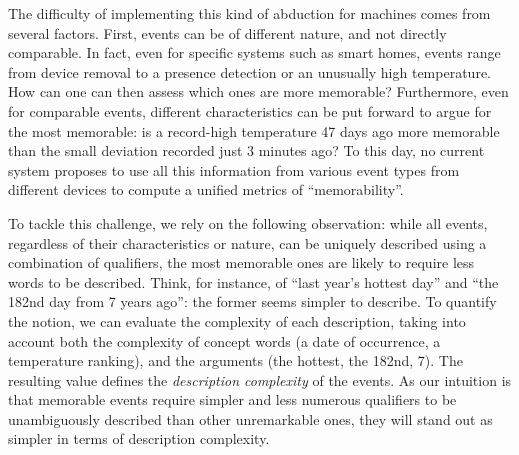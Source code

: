 \documentclass[conference]{IEEEtran}
\begin{document}
The difficulty of implementing this kind of abduction for machines comes from
several factors. First, events can be of different nature, and not directly
comparable. In fact, even for specific systems such as smart homes, events
range from device removal to a presence detection or an unusually high
temperature. How can one can then assess which ones are more memorable?
Furthermore, even for comparable events, different characteristics can be put
forward to argue for the most memorable: is a record-high temperature 47 days
ago more memorable than the small deviation recorded just 3 minutes ago? To
this day, no current system proposes to use all this information from various
event types from different devices to compute a unified metrics of
``memorability''.



To tackle this challenge, we rely on the following observation: while all
events, regardless of their characteristics or nature, can be uniquely
described using a combination of qualifiers, the most memorable ones are
likely to require less words to be described. Think, for instance, of
``last year's hottest day'' and ``the 182nd day from 7 years ago'': the
former seems simpler to describe. To quantify the notion, we can evaluate the complexity of each
description, taking into account both the complexity of concept words (a date
of occurrence, a temperature ranking), and the arguments (the hottest, the
182nd, 7). The resulting value defines the  \emph{description complexity}
of the events. As our intuition is that memorable events require simpler and less numerous qualifiers to be
unambiguously described than other unremarkable ones, they will stand out as simpler in terms of description complexity.
\end{document}
